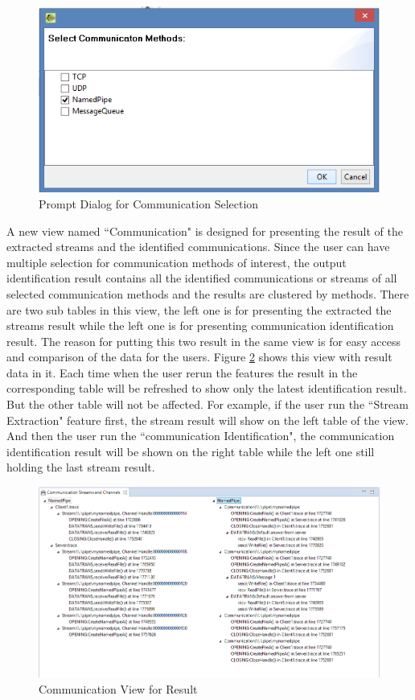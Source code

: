\begin{figure}[H]
\centerline{\includegraphics[scale=0.8]{Figures/methods}}
 \caption{Prompt Dialog for Communication Selection}
\label{methods}
\end{figure}

A new view named ``Communication" is designed for presenting the result of the extracted streams and the identified communications. Since the user can have multiple selection for communication methods of interest, the output identification result contains all the identified communications or streams of all selected communication methods and the results are clustered by methods. There are two sub tables in this view, the left one is for presenting the extracted the streams result while the left one is for presenting communication identification result. The reason for putting this two result in the same view is for easy access and comparison of the data for the users. Figure \ref{idenview} shows this view with result data in it. Each time when the user rerun the features the result in the corresponding table will be refreshed to show only the latest identification result. But the other table will not be affected. For example, if the user run the ``Stream Extraction" feature first, the stream result will show on the left table of the view. And then the user run the ``communication Identification", the communication identification result will be shown on the right table while the left one still holding the last stream result.

\begin{figure}[H]
\centerline{\includegraphics[scale=0.7]{Figures/idenview}}
 \caption{Communication View for Result}
\label{idenview}
\end{figure}

